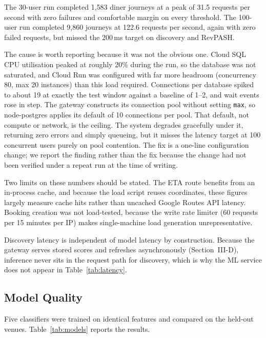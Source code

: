 \documentclass[conference]{IEEEtran}
\begin{document}
The 30-user run completed 1{,}583 diner journeys at a peak of 31.5 requests per second with zero failures and comfortable margin on every threshold. The 100-user run completed 9{,}860 journeys at 122.6 requests per second, again with zero failed requests, but missed the 200\,ms target on discovery and RevPASH.

The cause is worth reporting because it was not the obvious one. Cloud SQL CPU utilisation peaked at roughly 20\% during the run, so the database was not saturated, and Cloud Run was configured with far more headroom (concurrency 80, max 20 instances) than this load required. Connections per database spiked to about 19 at exactly the test window against a baseline of 1--2, and wait events rose in step. The gateway constructs its connection pool without setting \texttt{max}, so node-postgres applies its default of 10 connections per pool. That default, not compute or network, is the ceiling. The system degrades gracefully under it, returning zero errors and simply queueing, but it misses the latency target at 100 concurrent users purely on pool contention. The fix is a one-line configuration change; we report the finding rather than the fix because the change had not been verified under a repeat run at the time of writing.

Two limits on these numbers should be stated. The ETA route benefits from an in-process cache, and because the load script reuses coordinates, these figures largely measure cache hits rather than uncached Google Routes API latency. Booking creation was not load-tested, because the write rate limiter (60 requests per 15 minutes per IP) makes single-machine load generation unrepresentative.

Discovery latency is independent of model latency by construction. Because the gateway serves stored scores and refreshes asynchronously (Section~III-D), inference never sits in the request path for discovery, which is why the ML service does not appear in Table~\ref{tab:latency}.

\subsection{Model Quality}

Five classifiers were trained on identical features and compared on the held-out venues. Table~\ref{tab:models} reports the results.
\end{document}
